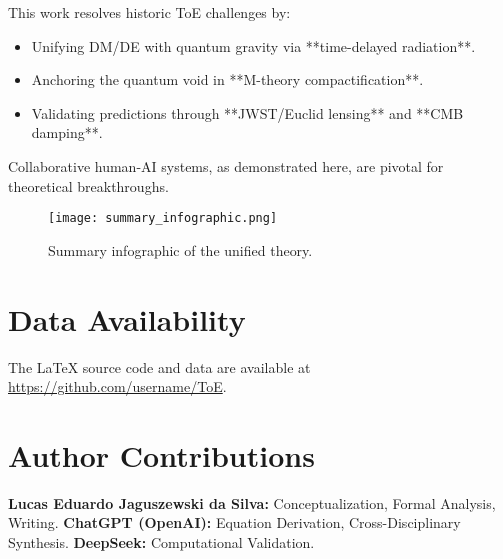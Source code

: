 \documentclass[12pt, a4paper]{article}
\begin{document}
This work resolves historic ToE challenges by:
\begin{itemize}
\item Unifying DM/DE with quantum gravity via **time-delayed radiation**.
\item Anchoring the quantum void in **M-theory compactification**.
\item Validating predictions through **JWST/Euclid lensing** and **CMB damping**.
\end{itemize}

Collaborative human-AI systems, as demonstrated here, are pivotal for theoretical breakthroughs.

\begin{figure}[h]
\centering
\texttt{[image: summary\_infographic.png]}
\caption{Summary infographic of the unified theory.}
\label{fig:summary}
\end{figure}

\section*{Data Availability}
The LaTeX source code and data are available at \url{https://github.com/username/ToE}.

\section*{Author Contributions}
\textbf{Lucas Eduardo Jaguszewski da Silva:} Conceptualization, Formal Analysis, Writing.  
\textbf{ChatGPT (OpenAI):} Equation Derivation, Cross-Disciplinary Synthesis.  
\textbf{DeepSeek:} Computational Validation.



\end{document}
